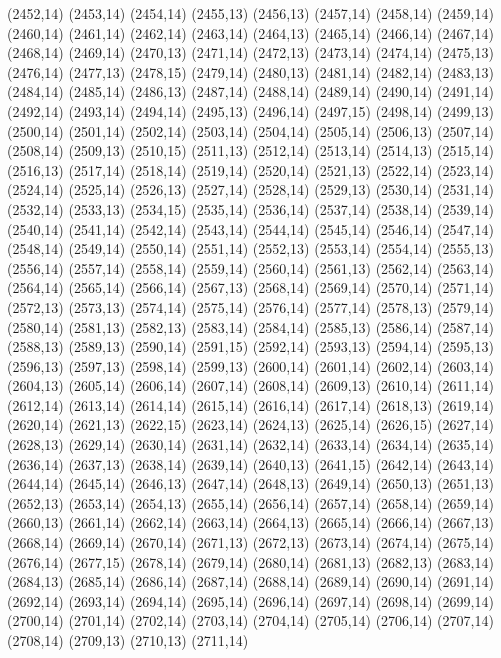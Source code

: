 (2452,14)
(2453,14)
(2454,14)
(2455,13)
(2456,13)
(2457,14)
(2458,14)
(2459,14)
(2460,14)
(2461,14)
(2462,14)
(2463,14)
(2464,13)
(2465,14)
(2466,14)
(2467,14)
(2468,14)
(2469,14)
(2470,13)
(2471,14)
(2472,13)
(2473,14)
(2474,14)
(2475,13)
(2476,14)
(2477,13)
(2478,15)
(2479,14)
(2480,13)
(2481,14)
(2482,14)
(2483,13)
(2484,14)
(2485,14)
(2486,13)
(2487,14)
(2488,14)
(2489,14)
(2490,14)
(2491,14)
(2492,14)
(2493,14)
(2494,14)
(2495,13)
(2496,14)
(2497,15)
(2498,14)
(2499,13)
(2500,14)
(2501,14)
(2502,14)
(2503,14)
(2504,14)
(2505,14)
(2506,13)
(2507,14)
(2508,14)
(2509,13)
(2510,15)
(2511,13)
(2512,14)
(2513,14)
(2514,13)
(2515,14)
(2516,13)
(2517,14)
(2518,14)
(2519,14)
(2520,14)
(2521,13)
(2522,14)
(2523,14)
(2524,14)
(2525,14)
(2526,13)
(2527,14)
(2528,14)
(2529,13)
(2530,14)
(2531,14)
(2532,14)
(2533,13)
(2534,15)
(2535,14)
(2536,14)
(2537,14)
(2538,14)
(2539,14)
(2540,14)
(2541,14)
(2542,14)
(2543,14)
(2544,14)
(2545,14)
(2546,14)
(2547,14)
(2548,14)
(2549,14)
(2550,14)
(2551,14)
(2552,13)
(2553,14)
(2554,14)
(2555,13)
(2556,14)
(2557,14)
(2558,14)
(2559,14)
(2560,14)
(2561,13)
(2562,14)
(2563,14)
(2564,14)
(2565,14)
(2566,14)
(2567,13)
(2568,14)
(2569,14)
(2570,14)
(2571,14)
(2572,13)
(2573,13)
(2574,14)
(2575,14)
(2576,14)
(2577,14)
(2578,13)
(2579,14)
(2580,14)
(2581,13)
(2582,13)
(2583,14)
(2584,14)
(2585,13)
(2586,14)
(2587,14)
(2588,13)
(2589,13)
(2590,14)
(2591,15)
(2592,14)
(2593,13)
(2594,14)
(2595,13)
(2596,13)
(2597,13)
(2598,14)
(2599,13)
(2600,14)
(2601,14)
(2602,14)
(2603,14)
(2604,13)
(2605,14)
(2606,14)
(2607,14)
(2608,14)
(2609,13)
(2610,14)
(2611,14)
(2612,14)
(2613,14)
(2614,14)
(2615,14)
(2616,14)
(2617,14)
(2618,13)
(2619,14)
(2620,14)
(2621,13)
(2622,15)
(2623,14)
(2624,13)
(2625,14)
(2626,15)
(2627,14)
(2628,13)
(2629,14)
(2630,14)
(2631,14)
(2632,14)
(2633,14)
(2634,14)
(2635,14)
(2636,14)
(2637,13)
(2638,14)
(2639,14)
(2640,13)
(2641,15)
(2642,14)
(2643,14)
(2644,14)
(2645,14)
(2646,13)
(2647,14)
(2648,13)
(2649,14)
(2650,13)
(2651,13)
(2652,13)
(2653,14)
(2654,13)
(2655,14)
(2656,14)
(2657,14)
(2658,14)
(2659,14)
(2660,13)
(2661,14)
(2662,14)
(2663,14)
(2664,13)
(2665,14)
(2666,14)
(2667,13)
(2668,14)
(2669,14)
(2670,14)
(2671,13)
(2672,13)
(2673,14)
(2674,14)
(2675,14)
(2676,14)
(2677,15)
(2678,14)
(2679,14)
(2680,14)
(2681,13)
(2682,13)
(2683,14)
(2684,13)
(2685,14)
(2686,14)
(2687,14)
(2688,14)
(2689,14)
(2690,14)
(2691,14)
(2692,14)
(2693,14)
(2694,14)
(2695,14)
(2696,14)
(2697,14)
(2698,14)
(2699,14)
(2700,14)
(2701,14)
(2702,14)
(2703,14)
(2704,14)
(2705,14)
(2706,14)
(2707,14)
(2708,14)
(2709,13)
(2710,13)
(2711,14)
